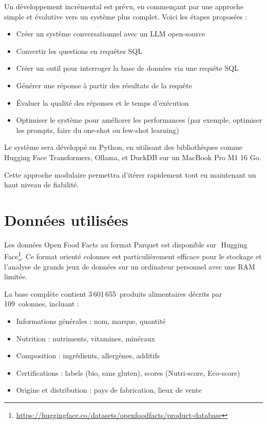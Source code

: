 \documentclass[a4paper,11pt]{article}
\begin{document}
Un développement incrémental est prévu, en commençant par une approche simple et évolutive vers un système plus complet.
Voici les étapes proposées :

\begin{itemize}
    \item Créer un système conversationnel avec un LLM open-source 
    \item Convertir les questions en requêtes SQL
    \item Créer un outil pour interroger la base de données via une requête SQL
    \item Générer une réponse à partir des résultats de la requête
    \item Évaluer la qualité des réponses et le temps d'exécution
    \item Optimiser le système pour améliorer les performances (par exemple, optimiser les prompts, faire du one-shot ou few-shot learning)
\end{itemize}

Le système sera développé en Python, en utilisant des bibliothèques comme Hugging Face Transformers, Ollama, et DuckDB sur un MacBook Pro M1 16 Go.

Cette approche modulaire permettra d'itérer rapidement tout en maintenant un haut niveau de fiabilité. 


\section{Données utilisées}
\label{sec:donnees}

Les données Open Food Facts au format Parquet est disponible sur~\,Hugging 
Face\footnote{\url{https://huggingface.co/datasets/openfoodfacts/product-database}}. 
Ce format orienté colonnes est particulièrement efficace pour le stockage et l'analyse de grands jeux de données sur un ordinateur personnel avec une RAM limitée.

La base complète contient 3\,601\,655~produits alimentaires décrits par 109~colonnes, incluant :

\begin{itemize}
    \item Informations générales : nom, marque, quantité
    \item Nutrition : nutriments, vitamines, minéraux
    \item Composition : ingrédients, allergènes, additifs
    \item Certifications : labels (bio, sans gluten), scores (Nutri-score, Eco-score)
    \item Origine et distribution : pays de fabrication, lieux de vente
\end{itemize}
\end{document}
